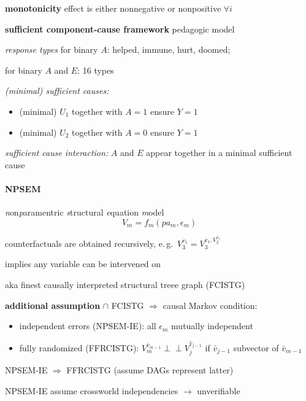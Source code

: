 \documentclass[8pt,oneside]{extarticle}
\newcommand{\indep}{\perp \!\!\! \perp}
\begin{document}
\begin{multicols}{2}
\noindent \textbf{monotonicity} effect is either nonnegative or nonpositive $\forall i$

\noindent \textbf{sufficient component-cause framework} pedagogic model

\noindent \textit{response types} for binary $A$: helped, immune, hurt, doomed;

\noindent for binary $A$ and $E$: 16 types

\noindent \textit{(minimal) sufficient causes: }
\begin{itemize}[itemsep=0em, topsep=0pt, partopsep=0pt,parsep=0pt, leftmargin=1.5em]
\setlength{\itemsep}{0pt}%
\setlength{\parskip}{0pt}
\item (minimal) $U_1$ together with $A=1$ ensure $Y=1$
\item (minimal) $U_2$ together with $A=0$ ensure $Y=1$
\end{itemize}
\textit{sufficient cause interaction:} $A$ and $E$ appear together in a minimal sufficient cause


\paragraph{\large NPSEM} \textit{n}on\textit{p}aramentric \textit{s}tructural \textit{e}quation \textit{m}odel
$$V_m = f_m(pa_m, \epsilon_m)$$

\noindent counterfactuals are obtained recursively, e.\,g.\  $V_3^{v_1} = V_3^{v_1, V_2^{v_1}}$

\noindent implies any variable can be intervened on

\noindent aka finest causally interpreted structural treee graph (FCISTG)

\noindent \textbf{additional assumption} $\cap$ FCISTG $\Rightarrow$ causal Markov condition:
\begin{itemize}[itemsep=0em, topsep=0pt, partopsep=0pt,parsep=0pt, leftmargin=1.5em]
\setlength{\itemsep}{0pt}%
\setlength{\parskip}{0pt}
\item independent errors (NPSEM-IE): all $\epsilon_m$ mutually independent
\item fully randomized (FFRCISTG):  $V_m^{\bar{v}_{m-1}} \indep V_j^{\bar{v}_{j-1}}$ if $\bar{v}_{j-1}$ subvector of $\bar{v}_{m-1}$
\end{itemize}

\noindent NPSEM-IE $\Rightarrow$ FFRCISTG (assume DAGs represent latter)

\noindent NPSEM-IE assume crossworld independencies $\to$ unverifiable



\end{multicols}
\end{document}
